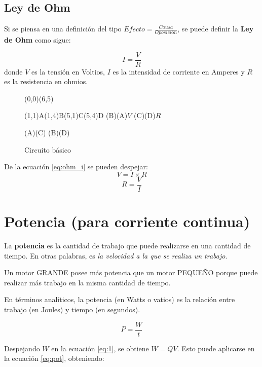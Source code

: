 \subsection{Ley de Ohm}
Si se piensa en una definición del tipo $Efecto=\frac{Causa}{\textit{Oposición}}$, se puede definir la \textbf{Ley de Ohm} como sigue:

\begin{equation}
	\label{eq:ohm_i}
	I=\frac{V}{R}
\end{equation}
donde $V$ es la tensión en Voltios, $I$ es la intensidad de corriente en Amperes y $R$ es la resistencia en ohmios.
\begin{figure}[h]
	\label{gr:ohm}
	\caption{Circuito básico}
	\begin{pspicture}(0,0)(6,5)

		\pnodes(1,1){A}(1,4){B}(5,1){C}(5,4){D}
		\vdc(B)(A){$V$}
		\resistor[dipolestyle=zigzag, tensionlabel=$I$](C)(D){$R$}

		\wire(A)(C)
		\wire(B)(D)
	\end{pspicture}

\end{figure}

De la ecuación \ref{eq:ohm_i} se pueden despejar:
\begin{equation}
	\label{eq:ohm_v}
	V=I \times R
\end{equation}
\begin{equation}
	\label{eq:ohm_r}
	R=\frac{V}{I}
\end{equation}
\section{Potencia (para corriente continua)}
La \textbf{potencia} es la cantidad de trabajo que puede realizarse en una cantidad de tiempo. En otras palabras, es \textit{la velocidad a la que se realiza un trabajo}.

\begin{ejemplo}
	Un motor GRANDE posee más potencia que un motor PEQUEÑO porque puede realizar más trabajo en la misma cantidad de tiempo.
\end{ejemplo}

En términos analíticos, la potencia (en Watts o vatios) es la relación entre trabajo (en Joules) y tiempo (en segundos).

\begin{equation}
	\label{eq:pot}
	P = \frac{W}{t}
\end{equation}

Despejando $W$ en la ecuación \ref{eq:1}, se obtiene $ W=QV $. Esto puede aplicarse en la ecuación \ref{eq:pot}, obteniendo:

